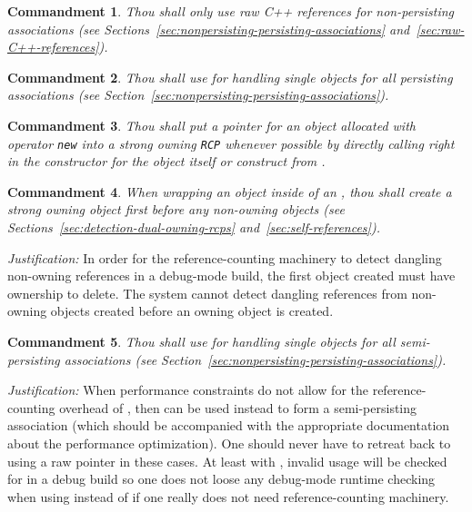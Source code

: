 \documentclass[pdf,ps2pdf,11pt]{SANDreport}
\newtheorem{commandment}{Commandment}
\begin{document}
\begin{commandment}
Thou shall only use raw C++ references for non-persisting associations
(see Sections~\ref{sec:nonpersisting-persisting-associations}
and~\ref{sec:raw-C++-references}).
\end{commandment}

\begin{commandment}
Thou shall use {} for handling single objects for all
persisting associations (see
Section~\ref{sec:nonpersisting-persisting-associations}).
\end{commandment}

\begin{commandment}\label{cmnd:rcp-new}
Thou shall put a pointer for an object allocated with operator
{}\texttt{new} into a strong owning {}\texttt{RCP} whenever possible
by directly calling {} right in the constructor for the
{} object itself or construct from {}.
\end{commandment}

\begin{commandment}\label{cmnd:owning-rcp-first}
When wrapping an object inside of an {}, thou shall create a
strong owning {} object first before any non-owning
{} objects (see Sections~\ref{sec:detection-dual-owning-rcps}
and~\ref{sec:self-references}).
\end{commandment}

{}\textit{Justification:} In order for the reference-counting
machinery to detect dangling non-owning references in a debug-mode
build, the first {} object created must have ownership to
delete.  The system cannot detect dangling references from non-owning
{} objects created before an owning {}
object is created.

\begin{commandment}\label{cmnd:ptr-semi-persisting}
Thou shall use {} for handling single objects for all
semi-persisting associations (see
Section~\ref{sec:nonpersisting-persisting-associations}).
\end{commandment}

{}\textit{Justification:} When performance constraints do not allow
for the reference-counting overhead of {}, then {}
can be used instead to form a semi-persisting association (which
should be accompanied with the appropriate documentation about the
performance optimization).  One should never have to retreat back to
using a raw pointer in these cases.  At least with {},
invalid usage will be checked for in a debug build so one does not
loose any debug-mode runtime checking when using {} instead
of {} if one really does not need reference-counting
machinery.
\end{document}
